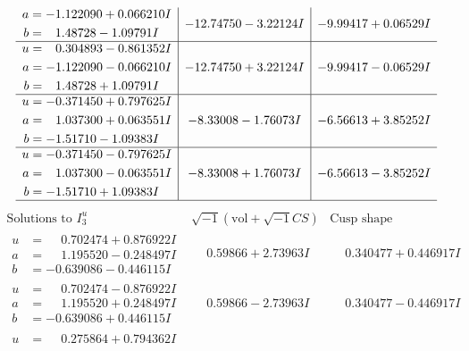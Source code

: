 \documentclass[1p]{elsarticle_modified}
\theoremstyle{definition}
\newcommand{\I}{\sqrt{-1}}
\begin{document}
$$\begin{array}{c|c|c}
\begin{aligned}
a &= -1.122090 + 0.066210 I \\
b &= \phantom{-}1.48728 - 1.09791 I\end{aligned}
 & -12.74750 - 3.22124 I & -9.99417 + 0.06529 I \\ \hline\begin{aligned}
u &= \phantom{-}0.304893 - 0.861352 I \\
a &= -1.122090 - 0.066210 I \\
b &= \phantom{-}1.48728 + 1.09791 I\end{aligned}
 & -12.74750 + 3.22124 I & -9.99417 - 0.06529 I \\ \hline\begin{aligned}
u &= -0.371450 + 0.797625 I \\
a &= \phantom{-}1.037300 + 0.063551 I \\
b &= -1.51710 - 1.09383 I\end{aligned}
 & -8.33008 - 1.76073 I & -6.56613 + 3.85252 I \\ \hline\begin{aligned}
u &= -0.371450 - 0.797625 I \\
a &= \phantom{-}1.037300 - 0.063551 I \\
b &= -1.51710 + 1.09383 I\end{aligned}
 & -8.33008 + 1.76073 I & -6.56613 - 3.85252 I\\
 \hline 
 \end{array}$$\newpage$$\begin{array}{c|c|c}  
\text{Solutions to }I^u_{3}& \I (\text{vol} + \sqrt{-1}CS) & \text{Cusp shape}\\
 \hline 
\begin{aligned}
u &= \phantom{-}0.702474 + 0.876922 I \\
a &= \phantom{-}1.195520 - 0.248497 I \\
b &= -0.639086 - 0.446115 I\end{aligned}
 & \phantom{-}0.59866 + 2.73963 I & \phantom{-}0.340477 + 0.446917 I \\ \hline\begin{aligned}
u &= \phantom{-}0.702474 - 0.876922 I \\
a &= \phantom{-}1.195520 + 0.248497 I \\
b &= -0.639086 + 0.446115 I\end{aligned}
 & \phantom{-}0.59866 - 2.73963 I & \phantom{-}0.340477 - 0.446917 I \\ \hline\begin{aligned}
u &= \phantom{-}0.275864 + 0.794362 I \\

\end{aligned}
\end{array}$$
\end{document}
